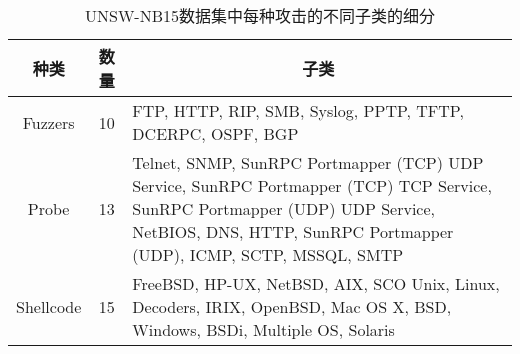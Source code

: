 \begin{table}[htbp]
	\caption{UNSW-NB15数据集中每种攻击的不同子类的细分}
	\label{tab:UNSW-NB15_class}
	\begin{tabularx}{\textwidth}{@{}ccX@{}}
		\toprule
		\multicolumn{1}{c}{\textbf{种类}} & \multicolumn{1}{c}{\textbf{数量}} & \multicolumn{1}{c}{\textbf{子类}}                                                                                                                                                                                                                                                                                                                                                                                                                                                                                                                                     \\
		\midrule
		Fuzzers                         & 10                              & FTP, HTTP, RIP, SMB, Syslog, PPTP, TFTP, DCERPC, OSPF, BGP                                                                                                                                                                                                                                                                                                                                                                                                                                                                                                          \\
		Probe                           & 13                              & Telnet, SNMP, SunRPC Portmapper (TCP) UDP Service, SunRPC Portmapper (TCP) TCP Service, SunRPC Portmapper (UDP) UDP Service, NetBIOS, DNS, HTTP,
		SunRPC Portmapper (UDP), ICMP, SCTP, MSSQL, SMTP                                                                                                                                                                                                                                                                                                                                                                                                                                                                                                                                                                                        \\
		Shellcode                       & 15                              & FreeBSD, HP-UX, NetBSD, AIX, SCO Unix, Linux, Decoders, IRIX, OpenBSD, Mac OS X, BSD, Windows, BSDi, Multiple OS, Solaris                                                                                                                                                                                                                                                                                                                                                                                                                                           \\

\end{tabularx}
\end{table}
